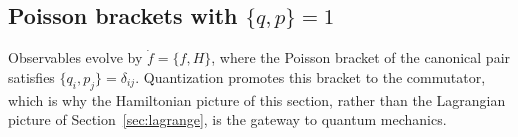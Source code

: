 \documentclass[11pt]{article}
\begin{document}
\subsection{Poisson brackets with \texorpdfstring{$\{q, p\} = 1$}{{q,p} = 1}}
\label{sec:poisson}

Observables evolve by $\dot{f} = \{f, H\}$, where the Poisson bracket of the
canonical pair satisfies $\{q_i, p_j\} = \delta_{ij}$. Quantization promotes
this bracket to the commutator, which is why the Hamiltonian picture of this
section, rather than the Lagrangian picture of Section~\ref{sec:lagrange},
is the gateway to quantum mechanics.
\end{document}
